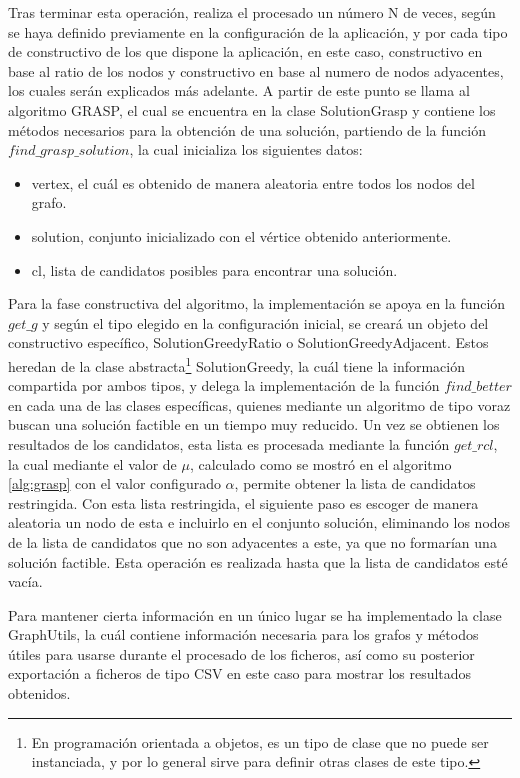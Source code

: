 Tras terminar esta operación, realiza el procesado un número N de veces, según se haya definido previamente en la configuración de la aplicación, y por cada tipo de constructivo de los que dispone la aplicación, en este caso, constructivo en base al ratio de los nodos y constructivo en base al numero de nodos adyacentes, los cuales serán explicados más adelante. A partir de este punto se llama al algoritmo \gls{GRASP}, el cual se encuentra en la clase SolutionGrasp y contiene los métodos necesarios para la obtención de una solución, partiendo de la función $find\_grasp\_solution$, la cual inicializa los siguientes datos:
\begin{itemize}
	\item vertex, el cuál es obtenido de manera aleatoria entre todos los nodos del grafo.
	\item solution, conjunto inicializado con el vértice obtenido anteriormente.
	\item cl, lista de candidatos posibles para encontrar una solución.
\end{itemize}

Para la fase constructiva del algoritmo, la implementación se apoya en la función $get\_g$ y según el tipo elegido en la configuración inicial, se creará un objeto del constructivo específico, SolutionGreedyRatio o SolutionGreedyAdjacent. Estos heredan de la clase abstracta\footnote{En programación orientada a objetos, es un tipo de clase que no puede ser instanciada, y por lo general sirve para definir otras clases de este tipo.} SolutionGreedy, la cuál tiene la información compartida por ambos tipos, y delega la implementación de la función $find\_better$ en cada una de las clases específicas, quienes mediante un algoritmo de tipo voraz buscan una solución factible en un tiempo muy reducido.
Un vez se obtienen los resultados de los candidatos, esta lista es procesada mediante la función $get\_rcl$, la cual mediante el valor de $\mu$, calculado como se mostró en el algoritmo \ref{alg:grasp} con el valor configurado $\alpha$, permite obtener la lista de candidatos restringida.
Con esta lista restringida, el siguiente paso es escoger de manera aleatoria un nodo de esta e incluirlo en el conjunto solución, eliminando los nodos de la lista de candidatos que no son adyacentes a este, ya que no formarían una solución factible.
Esta operación es realizada hasta que la lista de candidatos esté vacía.

Para mantener cierta información en un único lugar se ha implementado la clase GraphUtils, la cuál contiene información necesaria para los grafos y métodos útiles para usarse durante el procesado de los ficheros, así como su posterior exportación a ficheros de tipo CSV en este caso para mostrar los resultados obtenidos.


